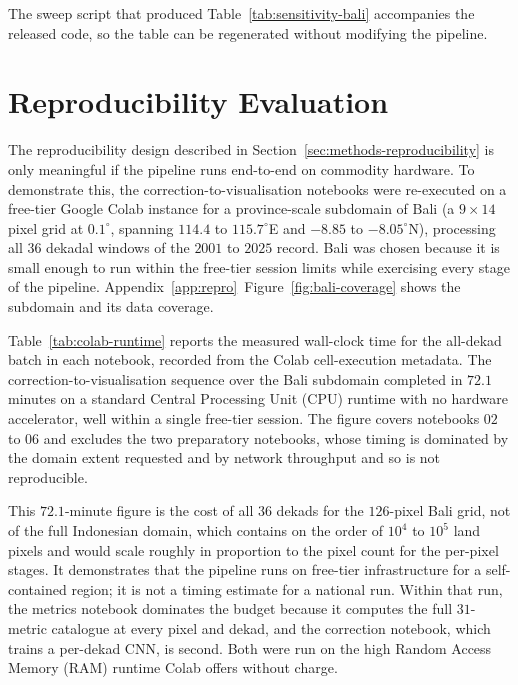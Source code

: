The sweep script that produced Table~\ref{tab:sensitivity-bali}
accompanies the released code, so the table can be regenerated
without modifying the pipeline.


\section{Reproducibility Evaluation}\label{sec:results-reproducibility}

The reproducibility design described in
Section~\ref{sec:methods-reproducibility} is only meaningful if
the pipeline runs end-to-end on commodity hardware. To
demonstrate this, the correction-to-visualisation notebooks were
re-executed on a free-tier Google Colab instance for a
province-scale subdomain of Bali (a $9 \times 14$ pixel grid at
$0.1^{\circ}$, spanning $114.4$ to $115.7^{\circ}$E and $-8.85$
to $-8.05^{\circ}$N), processing all $36$ dekadal windows of the
$2001$ to $2025$ record. Bali was chosen because it is small
enough to run within the free-tier session limits while
exercising every stage of the pipeline.
Appendix~\ref{app:repro}~Figure~\ref{fig:bali-coverage} shows the
subdomain and its data coverage.

Table~\ref{tab:colab-runtime} reports the measured wall-clock
time for the all-dekad batch in each notebook, recorded from the
Colab cell-execution metadata. The correction-to-visualisation
sequence over the
Bali subdomain completed in $72.1$ minutes on a standard Central
Processing Unit (CPU) runtime with no hardware accelerator, well
within a single
free-tier session. The figure covers notebooks $02$ to $06$ and
excludes the two preparatory notebooks, whose timing is dominated
by the domain extent requested and by network throughput and so is
not reproducible.

This $72.1$-minute figure is the cost of all
$36$ dekads for the $126$-pixel Bali grid, not of the full
Indonesian domain, which contains on the order of $10^{4}$ to
$10^{5}$ land pixels and would scale roughly in proportion to the
pixel count for the per-pixel stages. It demonstrates that the
pipeline runs on free-tier infrastructure for a self-contained
region; it is not a timing estimate for a national run. Within
that run, the metrics notebook dominates the budget because it
computes the full $31$-metric catalogue at every pixel and dekad,
and the correction notebook, which trains a per-dekad CNN, is
second. Both were run on the high Random Access Memory (RAM)
runtime Colab offers without charge.

